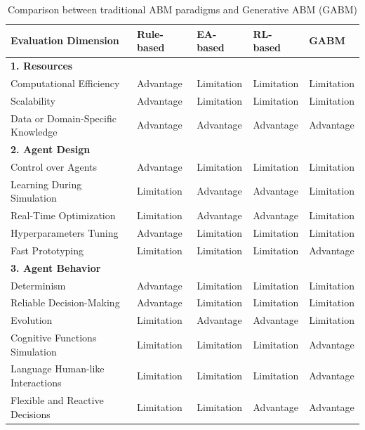 \documentclass[12pt,a4paper]{report}
\begin{document}
\begin{table}[H]
\centering
\vspace{-0.5cm}
\caption{Comparison between traditional ABM paradigms and Generative ABM (GABM)}
\label{tab:table3_comparison}
\vspace{0.2cm}
\setlength{\tabcolsep}{4pt}
\renewcommand{\arraystretch}{1.15}
\small
\begin{tabular}{|p{5.4cm}|p{2.2cm}|p{2.2cm}|p{2.2cm}|p{2.2cm}|}
\hline
\textbf{Evaluation Dimension} & \textbf{Rule-based} & \textbf{EA-based} & \textbf{RL-based} & \textbf{GABM} \\
\hline
\multicolumn{5}{|l|}{\textbf{1. Resources}} \\
\hline
\quad Computational Efficiency & Advantage & Limitation & Limitation & Limitation \\
\hline
\quad Scalability & Advantage & Limitation & Limitation & Limitation \\
\hline
\quad Data or Domain-Specific Knowledge & Advantage & Advantage & Advantage & Advantage \\
\hline
\multicolumn{5}{|l|}{\textbf{2. Agent Design}} \\
\hline
\quad Control over Agents & Advantage & Limitation & Limitation & Limitation \\
\hline
\quad Learning During Simulation & Limitation & Advantage & Advantage & Limitation \\
\hline
\quad Real-Time Optimization & Limitation & Advantage & Advantage & Limitation \\
\hline
\quad Hyperparameters Tuning & Advantage & Limitation & Limitation & Limitation \\
\hline
\quad Fast Prototyping & Limitation & Limitation & Limitation & Advantage \\
\hline
\multicolumn{5}{|l|}{\textbf{3. Agent Behavior}} \\
\hline
\quad Determinism & Advantage & Limitation & Limitation & Limitation \\
\hline
\quad Reliable Decision-Making & Advantage & Limitation & Limitation & Limitation \\
\hline
\quad Evolution & Limitation & Advantage & Advantage & Limitation \\
\hline
\quad Cognitive Functions Simulation & Limitation & Limitation & Limitation & Advantage \\
\hline
\quad Language Human-like Interactions & Limitation & Limitation & Limitation & Advantage \\
\hline
\quad Flexible and Reactive Decisions & Limitation & Limitation & Advantage & Advantage \\

\end{tabular}
\end{table}
\end{document}
